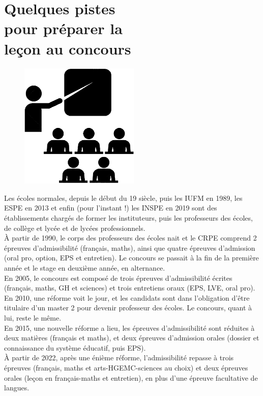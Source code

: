 \chapter{Quelques pistes\\pour préparer la\\leçon au concours} \label{Tra0}

\bigskip

\begin{figure}[h]
   \centering
      \includegraphics[height=6cm]{Transversal/Images/Tra0_cours_prof}
\end{figure}

\begin{prerequis}
   Les écoles normales, depuis le début du 19 siècle, puis les IUFM en 1989, les ESPE en 2013 et enfin (pour l'instant !) les INSPE en 2019 sont des établissements chargés de former les instituteurs, puis les professeurs des écoles, de collège et lycée et de lycées professionnels. \\
   À partir de 1990, le corps des professeurs des écoles nait et le CRPE comprend 2 épreuves d'admissibilité (français, maths), ainsi que quatre épreuves d'admission (oral pro, option, EPS et entretien). Le concours se passait à la fin de la première année et le stage en deuxième année, en alternance. \\
   En 2005, le concours est composé de trois épreuves d'admissibilité écrites (français, maths, GH et sciences) et trois entretiens oraux (EPS, LVE, oral pro). \\
   En 2010, une réforme voit le jour, et les candidats sont dans l'obligation d'être titulaire d'un master 2 pour devenir professeur des écoles. Le concours, quant à lui, reste le même. \\
   En 2015, une nouvelle réforme a lieu, les épreuves d'admissibilité sont réduites à deux matières (français et maths), et deux épreuves d'admission orales (dossier et connaissance du système éducatif, puis EPS). \\
   À partir de 2022, après une énième réforme, l'admissibilité repasse à trois épreuves (français, maths et arts-HGEMC-sciences au choix) et deux épreuves orales (leçon en français-maths et entretien), en plus d'une épreuve facultative de langues. 
\end{prerequis}


